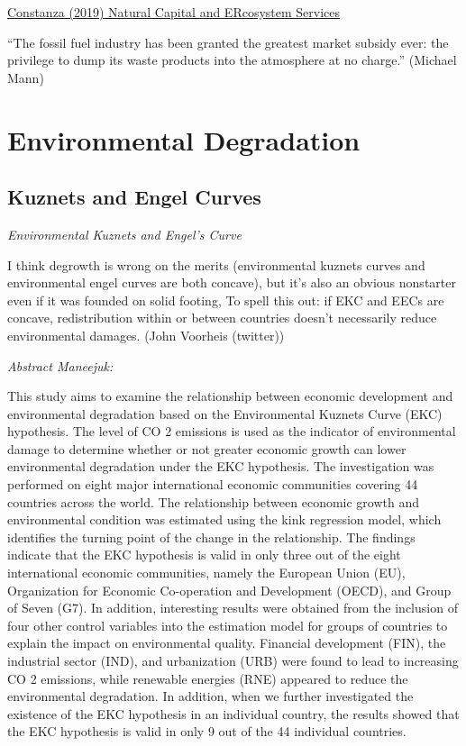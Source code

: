 \documentclass[
]{book}
\begin{document}
\href{pdf/Costanza_2019_Natural_Capital_and_Ecosystem_services.pdf}{Constanza (2019) Natural Capital and ERcosystem Services}

``The fossil fuel industry has been granted the greatest market subsidy ever: the privilege to dump its waste products into the atmosphere at no charge.'' (Michael Mann)

\hypertarget{environmental-degradation}{%
\section{Environmental Degradation}\label{environmental-degradation}}

\hypertarget{kuznets-and-engel-curves}{%
\subsection{Kuznets and Engel Curves}\label{kuznets-and-engel-curves}}

\emph{Environmental Kuznets and Engel's Curve}

I think degrowth is wrong on the merits (environmental kuznets curves and environmental engel curves
are both concave),
but it's also an obvious nonstarter even if it was founded on solid footing,
To spell this out: if EKC and EECs are concave,
redistribution within or between countries doesn't necessarily reduce environmental damages.
(John Voorheis (twitter))

\emph{Abstract Maneejuk:}

This study aims to examine the relationship between economic development and
environmental degradation based on the Environmental Kuznets Curve (EKC) hypothesis. The level
of CO 2 emissions is used as the indicator of environmental damage to determine whether or not greater
economic growth can lower environmental degradation under the EKC hypothesis. The investigation
was performed on eight major international economic communities covering 44 countries across
the world. The relationship between economic growth and environmental condition was estimated
using the kink regression model, which identifies the turning point of the change in the relationship.
The findings indicate that the EKC hypothesis is valid in only three out of the eight international
economic communities, namely the European Union (EU), Organization for Economic Co-operation
and Development (OECD), and Group of Seven (G7). In addition, interesting results were obtained
from the inclusion of four other control variables into the estimation model for groups of countries
to explain the impact on environmental quality. Financial development (FIN), the industrial sector
(IND), and urbanization (URB) were found to lead to increasing CO 2 emissions, while renewable
energies (RNE) appeared to reduce the environmental degradation. In addition, when we further
investigated the existence of the EKC hypothesis in an individual country, the results showed that the
EKC hypothesis is valid in only 9 out of the 44 individual countries.
\end{document}
